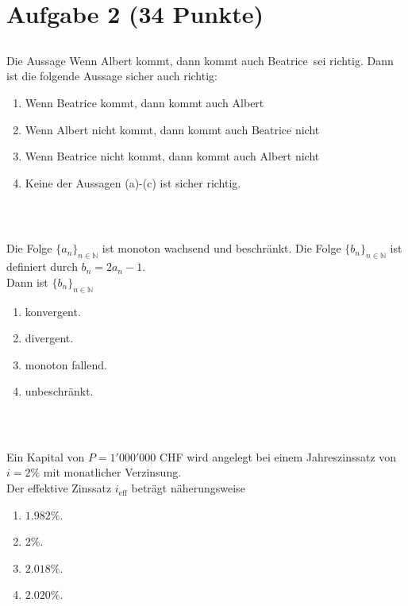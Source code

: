 \section*{Aufgabe 2 (34 Punkte)}
\vspace{0.4cm}
\subsection*{}
Die Aussage \glqq Wenn Albert kommt, dann kommt auch Beatrice\grqq~sei richtig.
Dann ist die folgende Aussage sicher auch richtig:
\renewcommand{\labelenumi}{(\alph{enumi})}
\begin{enumerate}
	\item \glqq Wenn Beatrice kommt, dann kommt auch Albert\grqq
	\item \glqq Wenn Albert nicht kommt, dann kommt auch Beatrice nicht\grqq
	\item
	\glqq Wenn Beatrice nicht kommt, dann kommt auch Albert nicht\grqq
	
	\item
	Keine der Aussagen (a)-(c) ist sicher richtig.
\end{enumerate}
\ \\
\subsection*{}
Die Folge $ \lbrace a_n \rbrace_{n \in \mathbb{N}} $ ist monoton wachsend und beschränkt. Die Folge $ \lbrace b_n \rbrace_{n \in \mathbb{N} }  $ ist definiert durch $ b_n = 2 a_n -1 $.\\
Dann ist $ \lbrace b_n \rbrace_{n \in \mathbb{N}} $
\renewcommand{\labelenumi}{(\alph{enumi})}
\begin{enumerate}
\item konvergent.
\item divergent.
\item
monoton fallend.
\item
unbeschränkt.
\end{enumerate}
\ \\
\subsection*{}
Ein Kapital von $ P = 1'000'000 $ CHF wird angelegt bei einem Jahreszinssatz von $ i = 2\% $ mit monatlicher Verzinsung.\\
Der effektive Zinssatz $ i_{\textrm{eff}} $ beträgt näherungsweise 
\renewcommand{\labelenumi}{(\alph{enumi})}
\begin{enumerate}
\item 
$ 1.982 \% $.
\item 
$ 2 \% $.
\item 
$ 2.018 \% $.
\item
$ 2.020 \% $.
\end{enumerate}
\ \\
